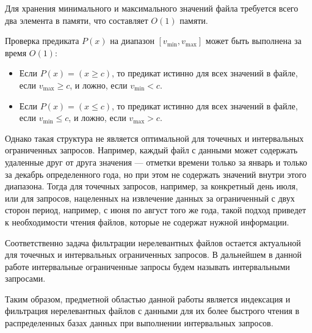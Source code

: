 Для хранения минимального и максимального значений файла требуется всего два элемента в памяти, что составляет $O(1)$ памяти.

Проверка предиката $P(x)$ на диапазон $[v_{\min}, v_{\max}]$ может быть выполнена за время $O(1)$:
\begin{itemize}
    \item Если $P(x) = (x \geq c)$, то предикат истинно для всех значений в файле, если $v_{\max} \geq c$, и ложно, если $v_{\min} < c$.
    \item Если $P(x) = (x \leq c)$, то предикат истинно для всех значений в файле, если $v_{\min} \leq c$, и ложно, если $v_{\max} > c$.
\end{itemize}
\thmp

Однако такая структура не является оптимальной для точечных и интервальных ограниченных запросов. Например, каждый файл с данными может содержать удаленные друг от друга значения --- отметки времени только за январь и только за декабрь определенного года, но при этом не содержать значений внутри этого диапазона. Тогда для точечных запросов, например, за конкретный день июля, или для запросов, нацеленных на извлечение данных за ограниченный с двух сторон период, например, с июня по август того же года, такой подход приведет к необходимости чтения файлов, которые не содержат нужной информации.

Соответственно задача фильтрации нерелевантных файлов остается актуальной для точечных и интервальных ограниченных запросов. В дальнейшем в данной работе интервальные ограниченные запросы будем называть интервальными запросами.

Таким образом, предметной областью данной работы является индексация и фильтрация нерелевантных файлов с данными для их более быстрого чтения в распределенных базах данных при выполнении интервальных запросов.
